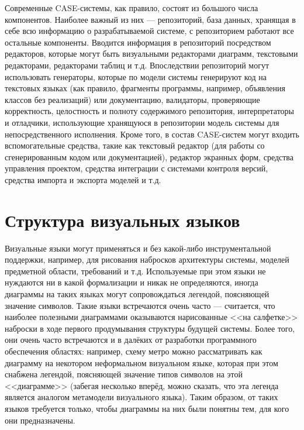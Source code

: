 Современные \ac{CASE}-системы, как правило, состоят из большого числа компонентов. 
Наиболее важный из них --- репозиторий, база данных, хранящая в себе всю 
информацию о разрабатываемой системе, с репозиторием работают все остальные 
компоненты. Вводится информация в репозиторий посредством редакторов, которые 
могут быть визуальными редакторами диаграмм, текстовыми редакторами, редакторами 
таблиц и т.д. Впоследствии репозиторий могут использовать генераторы, которые по 
модели системы генерируют код на текстовых языках (как правило, фрагменты 
программы, например, объявления классов без реализаций) или документацию, 
валидаторы, проверяющие корректность, целостность и полноту содержимого 
репозитория, интерпретаторы и отладчики, использующие хранящуюся в репозитории 
модель системы для непосредственного исполнения. Кроме того, в состав 
\ac{CASE}-систем могут входить вспомогательные средства, такие как текстовый редактор 
(для работы со сгенерированным кодом или документацией), редактор экранных форм, 
средства управления проектом, средства интеграции с системами контроля версий, 
средства импорта и экспорта моделей и т.д.

\section{Структура визуальных языков}
Визуальные языки могут применяться и без какой-либо инструментальной поддержки, 
например, для рисования набросков архитектуры системы, моделей предметной 
области, требований и т.д. Используемые при этом языки не нуждаются ни в какой 
формализации и никак не определяются, иногда диаграммы на таких языках могут 
сопровождаться легендой, поясняющей значение символов. Такие языки встречаются 
очень часто --- считается, что наиболее полезными диаграммами оказываются 
нарисованные <<на салфетке>> наброски в ходе первого продумывания структуры 
будущей системы. Более того, они очень часто встречаются и в далёких от 
разработки программного обеспечения областях: например, схему метро можно 
рассматривать как диаграмму на некотором неформальном визуальном языке, которая 
при этом снабжена легендой, поясняющей значение типов символов на этой 
<<диаграмме>> (забегая несколько вперёд, можно сказать, что эта легенда является 
аналогом метамодели визуального языка). Таким образом, от таких языков требуется 
только, чтобы диаграммы на них были понятны тем, для кого они предназначены.


